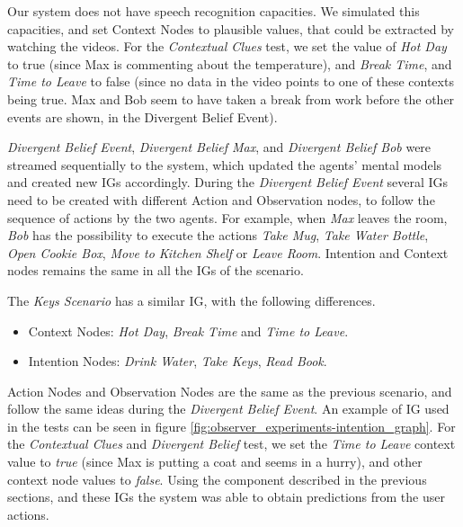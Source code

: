 Our system does not have speech recognition capacities. We simulated this capacities, and set Context Nodes to plausible values, that could be extracted by watching the videos. For the \textit{Contextual Clues} test, we set the value of \textit{Hot Day} to true (since Max is commenting about the temperature), and \textit{Break Time}, and \textit{Time to Leave} to false (since no data in the video points to one of these contexts being true. Max and Bob seem to have taken a break from work before the other events are shown, in the Divergent Belief Event).

\textit{Divergent Belief Event}, \textit{Divergent Belief Max}, and \textit{Divergent Belief Bob} were streamed sequentially to the system, which updated the agents' mental models and created new IGs accordingly. During the \textit{Divergent Belief Event} several IGs need to be created with different Action and Observation nodes, to follow the sequence of actions by the two agents. For example, when \textit{Max} leaves the room, \textit{Bob} has the possibility to execute the actions \textit{Take Mug}, \textit{Take Water Bottle}, \textit{Open Cookie Box}, \textit{Move to Kitchen Shelf} or \textit{Leave Room}. Intention and Context nodes remains the same in all the IGs of the scenario.


The \textit{Keys Scenario} has a similar IG, with the following differences.
\begin{itemize}
\item Context Nodes: \textit{Hot Day}, \textit{Break Time} and \textit{Time to Leave}.
\item Intention Nodes: \textit{Drink Water}, \textit{Take Keys}, \textit{Read Book}.
\end{itemize}

Action Nodes and Observation Nodes are the same as the previous scenario, and follow the same ideas during the \textit{Divergent Belief Event}. An example of IG used in the tests can be seen in figure \ref{fig:observer_experiments-intention_graph}. For the \textit{Contextual Clues} and \textit{Divergent Belief} test, we set the \textit{Time to Leave} context value to \textit{true} (since Max is putting a coat and seems in a hurry), and other context node values to \textit{false}. Using the component described in the previous sections, and these IGs the system was able to obtain predictions from the user actions.

